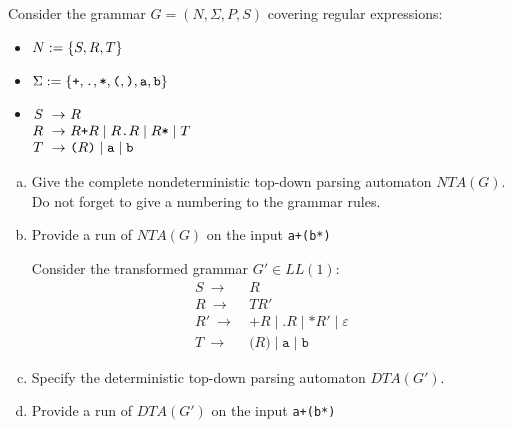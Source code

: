 \begin{exercise}{40}
Consider the grammar $G = (N, \Sigma, P, S)$ covering regular expressions:

\begin{itemize}
	\item $N := \left\{ S, R, T \right\}$
	\item $\Sigma := \left\{ \texttt{+}, \texttt{.}, \texttt{*}, \texttt{(}, \texttt{)}, \texttt{a}, \texttt{b} \right\}$
	\item
    $\begin{array}[t]{@{}r@{}l@{}}
        S ~\to~ & R \\
        R ~\to~ & R \texttt{+} R \mid R \texttt{.} R \mid R\texttt{*} \mid T \\
        T ~\to~ & \texttt{(} R \texttt{)} \mid \texttt{a} \mid \texttt{b}
    \end{array}$
\end{itemize}

\begin{enumerate}[(a)]
    \item Give the complete nondeterministic top-down parsing automaton $NTA(G)$. Do not forget to give a numbering to the grammar rules.

    \item Provide a run of $NTA(G)$ on the input \texttt{a+(b*)}

{}
Consider the transformed grammar $G' \in LL(1)$:
\begin{align*}
   S ~\to~ & R \\
   R ~\to~ & TR' \\
   R' ~\to~ & \texttt{+} R \mid \texttt{.} R \mid \texttt{*} R' \mid \varepsilon \\
   T ~\to~ & \texttt{(} R \texttt{)} \mid \texttt{a} \mid \texttt{b}
\end{align*}

    \item Specify the deterministic top-down parsing automaton $DTA(G')$.

    \item
	Provide a run of $DTA(G')$ on the input \texttt{a+(b*)}
\end{enumerate}
\end{exercise}

